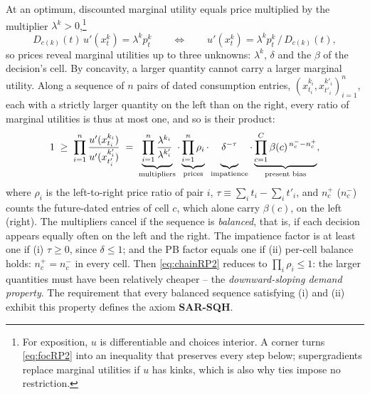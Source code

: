 \documentclass[11pt,a4paper]{article}
\theoremstyle{plain}
\theoremstyle{definition}
\begin{document}
\noindent At an optimum, discounted marginal utility equals price multiplied by the multiplier $\lambda^k>0$,\footnote{For exposition, $u$ is differentiable and choices interior. A corner turns \eqref{eq:focRP2} into an inequality that preserves every step below; supergradients replace marginal utilities if $u$ has kinks, which is also why ties impose no restriction.}
\begin{equation}\label{eq:focRP2}
D_{c(k)}(t)\,u'(x^k_t)=\lambda^k p^k_t
\qquad\Longleftrightarrow\qquad
u'(x^k_t)=\lambda^k p^k_t\,/\,D_{c(k)}(t) ,
\end{equation}
so prices reveal marginal utilities up to three unknowns: $\lambda^k$, $\delta$ and the $\beta$ of the decision's cell. By concavity, a larger quantity cannot carry a larger marginal utility. Along a sequence of $n$ pairs of dated consumption entries, $(x_{t_i}^{k_i}, x_{t'_i}^{k'_i})_{i=1}^n$, each with a strictly larger quantity on the left than on the right, every ratio of marginal utilities is thus at most one, and so is their product:
\begin{equation}\label{eq:chainRP2}
1\;\ge\;\prod_{i=1}^{n}\frac{u'(x^{k_i}_{t_i})}{u'(x^{k'_i}_{t'_i})}
\;=\;
\underbrace{\prod_{i=1}^{n}\frac{\lambda^{k_i}}{\lambda^{k'_i}}}_{\text{multipliers}}
\cdot
\underbrace{\prod_{i=1}^{n}\vphantom{\frac{\lambda^{k_i}}{\lambda^{k'_i}}}\rho_i}_{\text{prices}}
\cdot
\underbrace{\vphantom{\prod_{i=1}^{n}\frac{\lambda^{k_i}}{\lambda^{k'_i}}}\delta^{-\tau}}_{\text{impatience}}
\cdot
\underbrace{\prod_{c=1}^{C}\vphantom{\frac{\lambda^{k_i}}{\lambda^{k'_i}}}\beta(c)^{\,n^-_c-n^+_c}}_{\text{present bias}},
\end{equation}
where $\rho_i$ is the left-to-right price ratio of pair $i$, $\tau\equiv\sum_i t_i-\sum_i t'_i$, and $n^+_c$ ($n^-_c$) counts the future-dated entries of cell $c$, which alone carry $\beta(c)$, on the left (right). The multipliers cancel if the sequence is \emph{balanced}, that is, if each decision appears equally often on the left and the right. The impatience factor is at least one if (i) $\tau\ge0$, since $\delta\le1$; and the PB factor equals one if (ii) per-cell balance holds: $n^+_c=n^-_c$ in every cell. %
Then \eqref{eq:chainRP2} reduces to $\prod_i\rho_i\le1$: the larger quantities must have been relatively cheaper -- the \emph{downward-sloping demand property}.
The requirement that every balanced sequence satisfying (i) and (ii) exhibit this property defines the axiom \textbf{SAR-SQH}.
\end{document}
